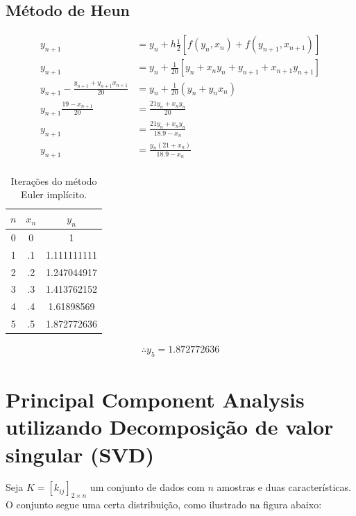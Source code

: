 \documentclass{article}
\begin{document}
	\subsection{Método de Heun}
		\begin{align*}
			y_{n+1} &= y_n +  h \frac{1}{2} [f(y_n, x_n) + f(y_{n+1}, x_{n+1})] \\
			y_{n+1} &= y_n + \frac{1}{20}[y_n + x_n y_n + y_{n+1} +  x_{n+1} y_{n+1}] \\
			y_{n+1} -\frac{y_{n+1} + y_{n+1} x_{n+1}}{20} &= y_n + \frac{1}{20}(y_n + y_n x_n) \\
			y_{n+1} \frac{19-x_{n+1}}{20}  &= \frac{21 y_n + x_n y_n}{20} \\
			y_{n+1} &= \frac{21 y_n + x_n y_n}{18.9 - x_n} \\
			y_{n+1} &= \frac{y_n (21 + x_n)}{18.9 - x_n} \\
		\end{align*}
		\begin{table}[H]
			\centering
			\begin{tabular}{|c|c|c|}
				\hline
				$n$ & $x_n$ & $y_n$ \\\hline
				0       &  0    & 1      				      \\\hline
				1       & .1    & 1.111111111 \\\hline
				2       & .2    & 1.247044917 \\\hline
				3       & .3    & 1.413762152 \\\hline
				4       & .4    & 1.61898569 \\\hline
				5       & .5    & 1.872772636 \\\hline
			\end{tabular}
			
			\captionsetup{justification=centering}
			\caption{Iterações do método Euler implícito.}
		\end{table}
		\begin{align*}
		\therefore
		y_5 = 1.872772636
		\end{align*}

	\newpage
	\section{Principal Component Analysis utilizando Decomposição de valor singular (SVD)}
	Seja $K = [k_{ij}]_{2 \times n}$ um conjunto de dados com $n$ amostras e duas características. O conjunto segue uma certa distribuição, como ilustrado na figura abaixo:
	
\end{document}
